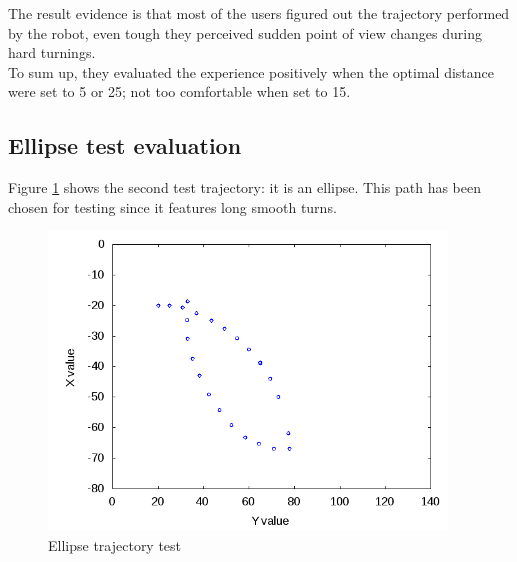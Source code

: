 The result evidence is that most of the users figured out the
trajectory performed by the robot, even tough they perceived
sudden point of view changes during hard turnings.
\\
To sum up, they evaluated the experience positively when the
optimal distance were set to 5 or 25; not too comfortable
when set to 15.


\subsection{Ellipse test evaluation}
\label{performance_evaluation:tests_result:ellipsetest}

Figure \ref{fig:ellipsetest} shows the second test trajectory:
it is an ellipse. This path has been chosen for testing since it
features long smooth turns.

\begin{figure}[!h]
  \begin{center}
    \includegraphics[width=300pt]{img/path_session_5.png}
    \caption{Ellipse trajectory test}
    \label{fig:ellipsetest}
  \end{center}
\end{figure}


